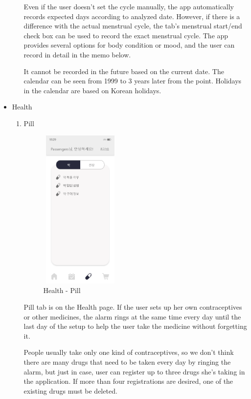 \documentclass[conference]{IEEEtran}
\begin{document}
\begin{itemize}
\begin{enumerate}
        Even if the user doesn't set the cycle manually, the app automatically records expected days according to analyzed date. However, if there is a difference with the actual menstrual cycle, the tab's menstrual start/end check box can be used to record the exact menstrual cycle. 
        The app provides several options for body condition or mood, and the user can record in detail in the memo below.
        
        It cannot be recorded in the future based on the current date. The calendar can be seen from 1999 to 3 years later from the point. Holidays in the calendar are based on Korean holidays.

    \end{enumerate}
    \item Health 
    
    \begin{enumerate}
    \setlength{\parindent}{2ex}
        \item Pill
        
        \begin{figure}[ht]
        \includegraphics[width=4cm, height=8cm, center]{Health - pill.png}
        \caption{Health - Pill}
        \label{fig : Health - Pill}
        \end{figure}
        Pill tab is on the Health page. If the user sets up her own contraceptives or other medicines, the alarm rings at the same time every day until the last day of the setup to help the user take the medicine without forgetting it. 
        
        People usually take only one kind of contraceptives, so we don’t think there are many drugs that need to be taken every day by ringing the alarm, but just in case, user can register up to three drugs she’s taking in the application. If more than four registrations are desired, one of the existing drugs must be deleted.
        

\end{enumerate}
\end{itemize}
\end{document}
